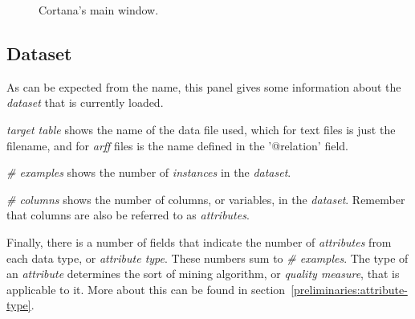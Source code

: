 \documentclass{article}
\begin{document}
\begin{figure}
\begin{center}
\centering
{}
\caption{Cortana's main window.}
\end{center}
\label{fig:mainwindow}
\end{figure}


\subsection{Dataset}
\label{main:dataset}
As can be expected from the name, this panel gives some information about the \emph{dataset} that is currently loaded.

\emph{target table} shows the name of the data file used, which for text files is just the filename, and for \emph{arff} files is the name defined in the '@relation' field.

\emph{\# examples} shows the number of \emph{instances} in the \emph{dataset}.

\emph{\# columns} shows the number of columns, or variables, in the \emph{dataset}.
Remember that columns are also be referred to as \emph{attributes}.

Finally, there is a number of fields that indicate the number of \emph{attributes} from each data type, or \emph{attribute type}.
These numbers sum to \emph{\# examples}.
The type of an \emph{attribute} determines the sort of mining algorithm, or \emph{quality measure}, that is applicable to it.
More about this can be found in section~\ref{preliminaries:attribute-type}.
\end{document}
